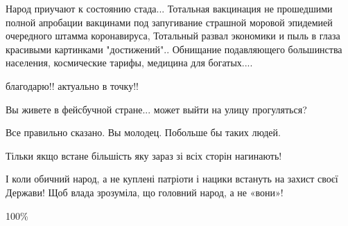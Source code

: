 \begin{itemize}
Народ приучают к состоянию стада... Тотальная вакцинация не прошедшими полной
апробации вакцинами под запугивание страшной моровой эпидемией очередного
штамма коронавируса, Тотальный развал экономики и пыль в глаза красивыми
картинками "достижений".. Обнищание подавляющего большинства населения,
космические тарифы, медицина для богатых....


 
благодарю!! актуально в точку!!

 
Вы живете в фейсбучной стране... может выйти на улицу прогуляться?

 
Все правильно сказано. Вы молодец.
Побольше бы таких людей.

 

Тільки якщо встане більшість яку зараз зі всіх сторін нагинають!

І коли обичний народ, а не куплені патріоти і нацики встануть на захист своєї
Держави! Щоб влада зрозуміла, що головний народ, а не «вони»!


 
100\%

 

\end{itemize}
